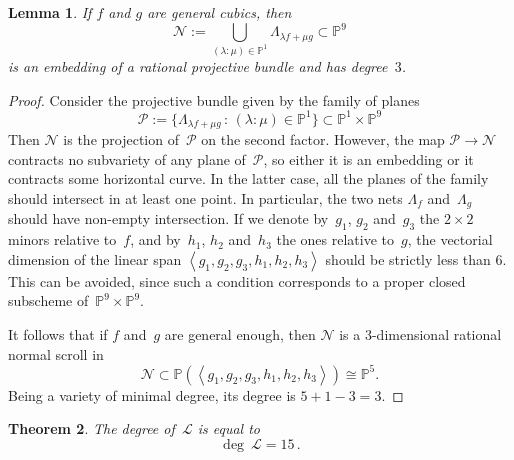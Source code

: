 \documentclass[a4paper, 11pt, reqno]{amsart}
\theoremstyle{plain}
\newtheorem{lemma}{Lemma}[section]
\newtheorem{theorem}[lemma]{Theorem}
\theoremstyle{definition}
\newcommand{\p}{\mathbb{P}}
\newcommand{\sL}{\mathcal{L}}
\begin{document}
\begin{lemma}
\label{lemma:scroll}
If $f$ and $g$ are general cubics, then
%
\[
  \mathcal{N} := \bigcup_{(\lambda : \mu) \in \p^1} \Lambda_{\lambda f + \mu g} \subset \p^9
\]
%
is an embedding of a rational projective bundle and has degree~$3$.
\end{lemma}
\begin{proof}
Consider the projective bundle given by the family of planes
%
\[
  \mathcal{P} := \{ \Lambda_{\lambda f + \mu g} \, : \, (\lambda: \mu) \in \p^1 \} \subset \p^1 \times \p^9
\]
%
Then $\mathcal{N}$ is the projection of~$\mathcal{P}$ on the second factor.
However, the map $\mathcal{P} \to \mathcal{N}$ contracts no subvariety of any plane of~$\mathcal{P}$, so either it is an embedding or it contracts some horizontal curve. In the latter case, all the planes of the family should intersect in at least one point. In particular, the two nets $\Lambda_f$ and~$\Lambda_g$ should have non-empty intersection.
If we denote by~$g_1$, $g_2$ and~$g_3$ the $2 \times 2$ minors relative to~$f$, and by~$h_1$, $h_2$ and~$h_3$ the ones relative to~$g$, the vectorial dimension of the linear span $\left\langle g_1, g_2, g_3, h_1, h_2, h_3 \right\rangle$ should be strictly less than $6$. This can be avoided, since such a condition corresponds to a proper closed subscheme of~$\p^9 \times \p^9$.

It follows that if $f$ and~$g$ are general enough, then $\mathcal{N}$ is a $3$-dimensional rational normal scroll in
%
\[
  \mathcal{N} \subset \p(\left\langle g_1, g_2, g_3, h_1, h_2, h_3 \right\rangle) \cong \p^5.
\]
%
Being a variety of minimal degree, its degree is $5+1-3 = 3$.
\end{proof}

\begin{theorem}
The degree of~$\sL$ is equal to
%
\[
  \deg \ \sL = 15 \,.
\]
%
\end{theorem}
\end{document}
